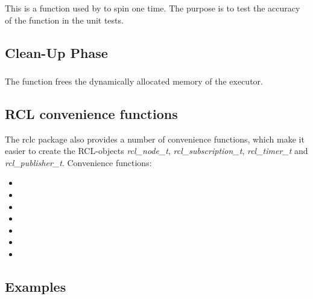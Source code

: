 \subsubsection{}
This is a function used by  to spin one time. The purpose is to test the accuracy of the  function in the unit tests.

\subsection{Clean-Up Phase}
\subsubsection{}
The function  frees the dynamically allocated memory of the executor.

\subsection{RCL convenience functions}
The rclc package also provides a number of convenience functions, which make it easier to create the RCL-objects \textit{rcl\_node\_t}, \textit{rcl\_subscription\_t}, \textit{rcl\_timer\_t} and \textit{rcl\_publisher\_t}. Convenience functions:
\begin{itemize}
    \item {}
    \item {}
    \item {}
    \item {}
    \item {}
    \item {}
    \item {}
\end{itemize}

\subsection{Examples}
